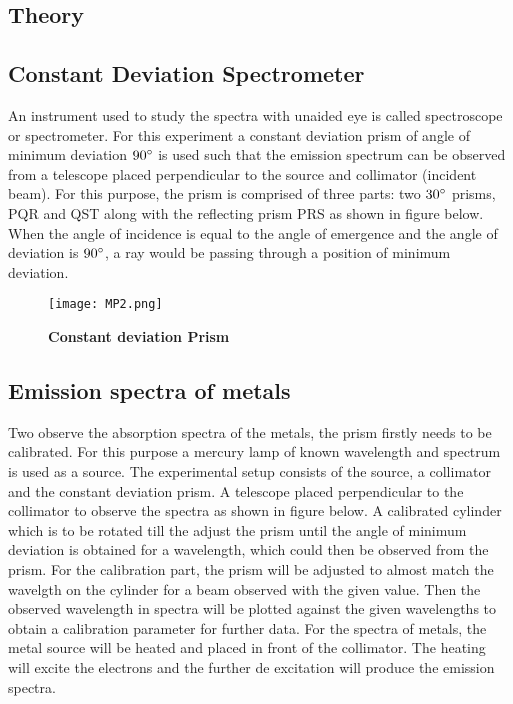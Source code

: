 \documentclass[9pt,a4paper]{article}
\begin{document}
\vspace*{0.5cm}
\begin{multicols*}{2}
\noindent

\section{Theory}
\subsection{Constant Deviation Spectrometer}
An instrument used to study the spectra with unaided eye is called spectroscope or spectrometer. For this experiment a constant deviation prism of angle of minimum deviation $90 \degree$ is used such that the emission spectrum can be observed from a telescope placed perpendicular to the source and collimator (incident beam). For this purpose, the prism is comprised of three parts: two $30 \degree$ prisms, PQR and QST along with the reflecting prism PRS as shown in figure below. When the angle of incidence is equal to the angle of emergence and the
angle of deviation is $90 \degree$, a ray would be passing through a position of minimum deviation. 

\begin{figure}[H]
\texttt{[image: MP2.png]}
\caption{\textbf{Constant deviation Prism}}
\label{fig1}
\end{figure}

\subsection{Emission spectra of metals}
Two observe the absorption spectra of the metals, the prism firstly needs to be calibrated. For this purpose a mercury lamp of known wavelength and spectrum is used as a source. The experimental setup consists of the source, a collimator and the constant deviation prism. A telescope placed perpendicular to the collimator to observe the spectra as shown in figure below. A calibrated cylinder which is to be rotated till the adjust the prism until the angle of minimum deviation is obtained for a wavelength, which could then be observed from the prism. For the calibration part, the prism will be adjusted to almost match the wavelgth on the cylinder for a beam observed with the given value. Then the observed wavelength in spectra will be plotted against the given wavelengths to obtain a calibration parameter for further data. For the spectra of metals, the metal source will be heated and placed in front of the collimator. The heating will excite the electrons and the further de excitation will produce the emission spectra.



\end{multicols*}
\end{document}
